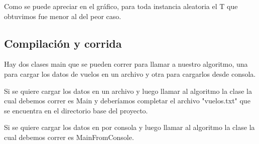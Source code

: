 Como se puede apreciar en el gr\'afico, para toda instancia aleatoria el T que obtuvimos fue menor al del peor caso.

\subsection{Compilaci\'on y corrida}

Hay dos clases main que se pueden correr para llamar a nuestro algoritmo, una para cargar los datos de vuelos en un archivo y otra para cargarlos desde consola.

Si se quiere cargar los datos en un archivo y luego llamar al algoritmo la clase la cual debemos correr es Main y deber\'iamos completar el archivo "vuelos.txt" que se encuentra en el directorio base del proyecto.

Si se quiere cargar los datos en por consola y luego llamar al algoritmo la clase la cual debemos correr es MainFromConsole.
